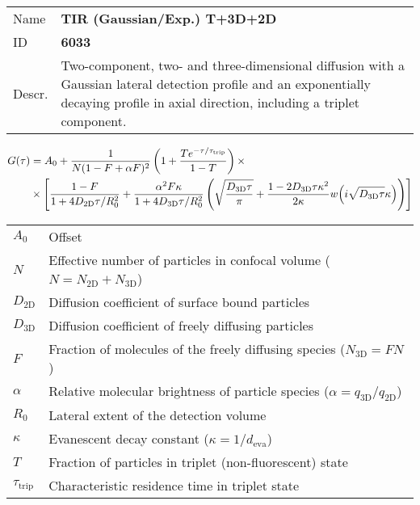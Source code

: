 \noindent \begin{tabular}{lp{}}
Name & \textbf{TIR (Gaussian/Exp.) T+3D+2D} \\ 
ID & \textbf{6033} \\ 
Descr. &  Two-component, two- and three-dimensional diffusion with a Gaussian lateral detection profile and an exponentially decaying profile in axial direction, including a triplet component\cite{Starr2001, Hassler2005, Ohsugi2006, Elson1974, Aragon1976, Palmer1987, Thomps:bookFCS2002}. \\ 
\end{tabular}
\begin{align}
G(\tau) &= A_0 + \frac{1}{N (1-F + \alpha F)^2} \left(1 + \frac{T e^{-\tau/\tau_\mathrm{trip}}}{1-T}  \right)  \times \\
& \notag \times  \left[
\frac{1-F}{1+ 4 D_\mathrm{2D} \tau/R_0^2} + 
\frac{\alpha^2 F \kappa}{1+ 4 D_\mathrm{3D} \tau/R_0^2} 
\left( \sqrt{\frac{D_\mathrm{3D} \tau}{\pi}} + \frac{1 - 2 D_\mathrm{3D} \tau \kappa^2}{2 \kappa}  w\!\left(i \sqrt{D_\mathrm{3D} \tau} \kappa\right) \right) \right]
\end{align} 
\begin{center}
\begin{tabular}{ll}
$A_0$ & Offset \\ 
$N$ & Effective number of particles in confocal volume ($N = N_\mathrm{2D}+N_\mathrm{3D}$) \\ 
$D_\mathrm{2D}$ &  Diffusion coefficient of surface bound particles \\ 
$D_\mathrm{3D}$ &  Diffusion coefficient of freely diffusing particles \\ 
$F$ & Fraction of molecules of the freely diffusing species ($N_\mathrm{3D} = F N$) \\
$\alpha$ & Relative molecular brightness of particle species ($ \alpha = q_\mathrm{3D}/q_\mathrm{2D}$) \\
$R_0$ & Lateral extent of the detection volume \\
$\kappa$ &  Evanescent decay constant ($\kappa = 1/d_\mathrm{eva}$)\\ 
$T$ &  Fraction of particles in triplet (non-fluorescent) state\\ 
$\tau_\mathrm{trip}$ &  Characteristic residence time in triplet state \\ 
\end{tabular}
\end{center}
\vspace{2em}





